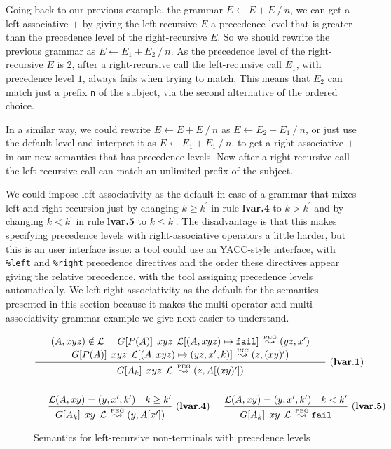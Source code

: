Going back to our previous example, the grammar $E \leftarrow E+E \ /\ n$,
we can get a left-associative $+$
by giving the left-recursive $E$ a precedence level that is greater
than the precedence level of the right-recursive $E$. So we should
rewrite the previous grammar as $E \leftarrow E_1+E_2 \ /\ n$. 
As the precedence level of the right-recursive
$E$ is $2$, after a right-recursive call the left-recursive call $E_1$,
with precedence level $1$, always fails when trying to match. This
means that $E_2$ can match just a prefix {\tt n} of the subject,
via the second alternative of the ordered choice.
 
In a similar way, we could rewrite $E \leftarrow E+E \ /\ n$ 
as $E \leftarrow E_2+E_1 \ /\ n$, or just use the default level and 
interpret it as $E \leftarrow E_1+E_1 \ /\ n$,
to get a right-associative $+$ in our new semantics that has
precedence levels. Now after a right-recursive call the left-recursive
call can match an unlimited prefix of the subject. 

We could impose left-associativity as the default in case of a grammar that
mixes left and right recursion just by changing $k \ge k^\prime$ in 
rule {\bf lvar.4} to $k > k^\prime$ and by changing $k < k^\prime$ in rule 
{\bf lvar.5} to $k \le k^\prime$. The disadvantage is that this makes specifying
precedence levels with right-associative operators a little harder, but this is
an user interface issue: a tool could use an YACC-style interface, with
{\tt \%left} and {\tt \%right} precedence directives and the order these directives appear
giving the relative precedence, with the tool assigning precedence levels automatically.
We left right-associativity as the default for the semantics presented in this section
because it makes the multi-operator and multi-associativity grammar example we give next
easier to understand.

\begin{figure}[t]
{\small
\begin{align*}
& 
{\frac{
\begin{array}{c}
\;\;\;\;
(A,xyz) \notin \mathcal{L} \interf
    \Matgm{P(A)}{xyz}{\mathcal{L}[(A,xyz) \mapsto \Nothing]} \Lp
    (yz,x^\prime)  \;\;\;\; \\ \;\;\;\;
				\Matgm{P(A)}{xyz}{\mathcal{L}[(A,xyz)
                                  \mapsto (yz,x^\prime,k)]} \Li
                                (z,(xy)^\prime) \;\;\;\;
\end{array}
}
	{\Matgm{A_k}{xyz}{\mathcal{L}} \Lp (z,A[(xy)^\prime])}} \mylabel{lvar.1} \\\\
&
      \fivespaces {\frac{\mathcal{L}(A,xy) = (y,x^\prime,k^\prime)\ \
          \ k \ge k^\prime}
	{\Matgm{A_k}{xy}{\mathcal{L}} \Lp (y,A[x^\prime])}} \mylabel{lvar.4}
      \interf
       {\frac{\mathcal{L}(A,xy) = (y,x^\prime,k^\prime)\ \ \ k < k^\prime}
	{\Matgm{A_k}{xy}{\mathcal{L}} \Lp \Nothing}} \mylabel{lvar.5}
\end{align*}
\caption{Semantics for left-recursive non-terminals with precedence levels}
\label{fig:leftrecprec}
}
\end{figure}


